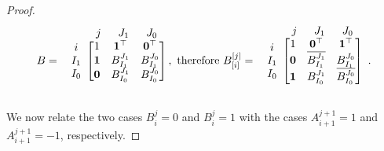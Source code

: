 \documentclass[11pt,a4paper]{amsart}
\theoremstyle{plain}
\theoremstyle{definition}
\begin{document}
\begin{proof}
$$B=\begin{array}{c@{}c}
& \begin{array}{lcc}
	j\;\; & J_1\;\; & J_0
\end{array}\\
\begin{array}{c}
	i\\I_1 \\ I_0
\end{array} &\begin{bmatrix}
	1 &\mathbf{1}^\top & \mathbf{0}^\top\\
	\mathbf{1} & B_{I_1}^{J_1} & B_{I_1}^{J_0} \\
	\mathbf{0} & B_{I_0}^{J_1} & B_{I_0}^{J_0} \\
\end{bmatrix}\\&\end{array}\!\!, \text{ therefore } B_{[i]}^{[j]}=\begin{array}{c@{}c}
& \begin{array}{ccc}
	j\;\; & J_1\;\; & J_0
\end{array}\\
\begin{array}{c}
	i\\I_1 \\ I_0
\end{array} &\begin{bmatrix}
	1 &\mathbf{0}^\top & \mathbf{1}^\top\\
	\mathbf{0} & \overline{B_{I_1}^{J_1}} & B_{I_1}^{J_0} \\
	\mathbf{1} & B_{I_0}^{J_1} & \overline{B_{I_0}^{J_0}} \\
\end{bmatrix}\\&\end{array}.$$

We now relate the two cases $B_i^j=0$ and $B_i^j=1$ with the cases $A_{i+1}^{j+1}=1$ and $A_{i+1}^{j+1}=-1$, respectively.


\end{proof}
\end{document}
